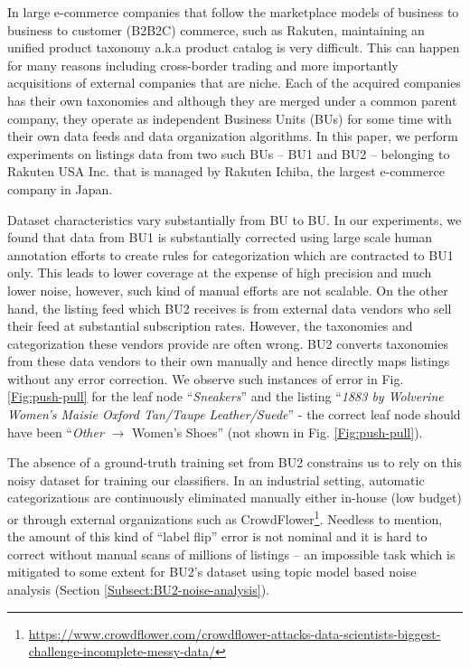 In large e-commerce companies that follow the marketplace models of business to business to customer (B2B2C) commerce, such as Rakuten, maintaining an unified product taxonomy a.k.a product catalog is very difficult. 
This can happen for many reasons including cross-border trading and more importantly acquisitions of external companies that are niche.
Each of the acquired companies has their own taxonomies and although they are merged under a common parent company, they operate as independent Business Units (BUs)  for some time with their own data feeds and data organization algorithms.
In this paper, we perform experiments on listings data from two such BUs -- BU1 and BU2 -- belonging to Rakuten USA Inc.
that is managed by Rakuten Ichiba, the largest e-commerce company in Japan.

Dataset characteristics vary substantially from BU to BU.
In our experiments, we found that data from BU1 is substantially corrected using large scale human annotation efforts to create rules for categorization which are contracted to BU1 only.
This leads to lower coverage at the expense of high precision and much lower noise, however, such kind of manual efforts are not scalable.
On the other hand, the listing feed which BU2 receives is from external data vendors who sell their feed at substantial subscription rates. 
However, the taxonomies and categorization these vendors provide are often wrong.
BU2 converts taxonomies from these data vendors to their own manually and hence directly maps listings without any error correction.
We observe such instances of error in Fig. \ref{Fig:push-pull} for the leaf node ``\textit{Sneakers}'' and the listing ``\textit{1883 by Wolverine Women's Maisie Oxford Tan/Taupe Leather/Suede}'' - the correct leaf node should have been ``\textit{Other} $\rightarrow$ Women's Shoes'' (not shown in Fig. \ref{Fig:push-pull}).

The absence of a ground-truth training set from BU2 constrains us to rely on this noisy dataset for training our classifiers. 
In an industrial setting, automatic categorizations are continuously eliminated manually either in-house (low budget) or through external organizations such as CrowdFlower\footnote{\scriptsize{\url{https://www.crowdflower.com/crowdflower-attacks-data-scientists-biggest-challenge-incomplete-messy-data/}}}.
Needless to mention, the amount of this kind of ``label flip'' error is not nominal and it is hard to correct without manual scans of millions of listings -- an impossible task which is mitigated to some extent for BU2's dataset using topic model based noise analysis (Section \ref{Subsect:BU2-noise-analysis}).


